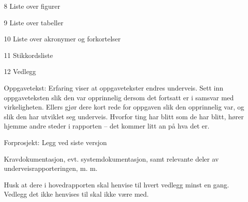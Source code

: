 8 Liste over figurer

9 Liste over tabeller

10 Liste over akronymer og forkortelser

11 Stikkordsliste

12 Vedlegg

Oppgavetekst: Erfaring viser at oppgavetekster endres underveis. Sett inn oppgaveteksten slik den var opprinnelig dersom det fortsatt er i samsvar med virkeligheten. Ellers gjør dere kort rede for oppgaven slik den opprinnelig var, og slik den har utviklet seg underveis. Hvorfor ting har blitt som de har blitt, hører hjemme andre steder i rapporten – det kommer litt an på hva det er.

Forprosjekt: Legg ved siste versjon

Kravdokumentasjon, evt. systemdokumentasjon, samt relevante deler av underveisrapporteringen, m. m.

Husk at dere i hovedrapporten skal henvise til hvert vedlegg minst en gang. Vedlegg det ikke henvises til skal ikke være med.